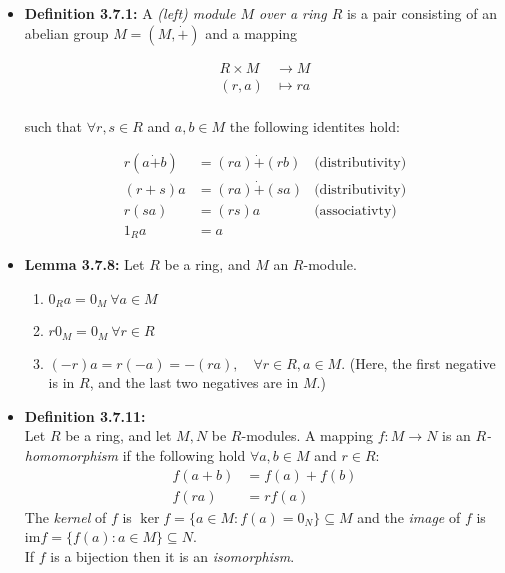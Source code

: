 \documentclass[11pt,a4paper]{article}
\begin{document}
\begin{itemize}
    \item \textbf{Definition 3.7.1:}
        A \emph{(left) module $M$ over a ring $R$} is a pair consisting of an abelian group
        $M = (M, \dot{+})$ and a mapping

        \begin{align*}{}
            R \times M & \to M \\
            (r,a)      & \mapsto ra \\
        \end{align*}

        such that $\forall r,s \in R$ and $a,b \in M$ the following identites hold:

        \begin{align*}{}
            r(a \dot{+} b) & = (ra) \dot{+} (rb) & \text{(distributivity)} \\
            (r+s)a         & = (ra) \dot{+} (sa) & \text{(distributivity)}\\
            r(sa)          & = (rs)a             & \text{(associativty)}\\
            {1_R}a         & = a
        \end{align*}

    \item \textbf{Lemma 3.7.8:} Let $R$ be a ring, and $M$ an $R$-module.
        \begin{enumerate}
            \item ${0_R}a = 0_M \ \forall a \in M$
            \item $r{0_M} = 0_M \ \forall r \in R$
            \item $(-r)a = r(-a) = -(ra), \quad \forall r \in R, a \in M$.
                (Here, the first negative is in $R$, and the last two negatives are in $M$.)
        \end{enumerate}

    \item \textbf{Definition 3.7.11:} \\
        Let $R$ be a ring, and let $M,N$ be $R$-modules.
        A mapping $f : M \to N$ is an \emph{$R$-homomorphism} if the following hold
        $\forall a,b \in M$ and $r \in R$:
        \begin{align*}{}
            f(a+b) & = f(a) + f(b) \\
            f(ra)  & = rf(a)
        \end{align*}
        The \emph{kernel} of $f$ is $\ker f = \{a\in M : f(a) = 0_N \} \subseteq M$
        and the \emph{image} of $f$ is $\mathrm{im} f = \{f(a) : a \in M\} \subseteq N$. \\
        If $f$ is a bijection then it is an \emph{isomorphism}.


\end{itemize}
\end{document}

